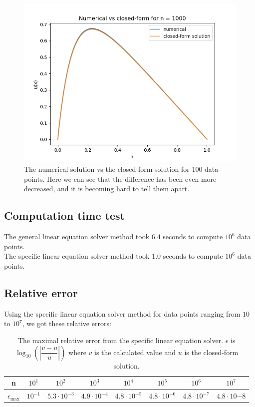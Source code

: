 \documentclass[a4paper,12pt,norsk]{article}
\begin{document}
	\begin{figure}[H]
		\includegraphics[scale = 0.7]{Figures/Figure_3.png}
		\centering
		\caption{The numerical solution vs the closed-form solution for 100 data-points. Here we can see that the difference has been even more decreased, and it is becoming hard to tell them apart.}
	\end{figure}

	\subsection{Computation time test}
	The general linear equation solver method took $6.4$ seconds to compute $10^6$ data points.\\
	The specific linear equation solver method took $1.0$ seconds to compute $10^6$ data points.

	\subsection{Relative error}
	Using the specific linear equation solver method for data points ranging from $10$ to $10^7$, we got these relative errors:
	\begin{table}[H]
		\begin{tabular}{|c|c|c|c|c|c|c|c|}
		\hline
		n & $10^{1}$ & $10^{2}$ & $10^{3}$ & $10^{4}$ & $10^5$ & $10^6$ & $10^7$\\
		\hline
		$\epsilon_\text{max}$ & $10^{-1}$ & $5.3 \cdot 10^{-3}$ & $4.9 \cdot 10^{-4}$ & $4.8 \cdot 10^{-5}$ & $4.8 \cdot 10^{-6}$ & $4.8 \cdot 10^{-7}$ & $4.8 \cdot 10{-8}$\\
		\hline
		\end{tabular}
	\centering
	\caption{The maximal relative error from the specific linear equation solver. $\epsilon$ is $\log_{10}(|\dfrac{v - u}{u}|)$ where $v$ is the calculated value and $u$ is the closed-form solution.}
	\end{table}
	
\end{document}
